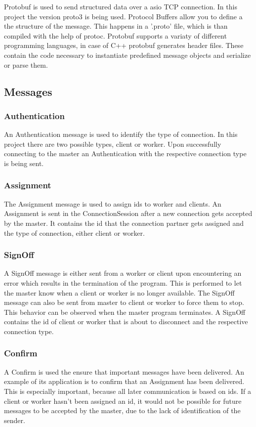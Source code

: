 \documentclass[12pt, letterpaper]{article}
\begin{document}
Protobuf is used to send structured data over a asio TCP connection. In this project the version proto3 is being used. Protocol Buffers allow you to define a the structure of the message. This happens in a '.proto' file, which is than compiled with the help of protoc. Protobuf supports a variaty of different programming languages, in case of C++ protobuf generates header files. These contain the code necessary to instantiate predefined message objects and serialize or parse them.  

\subsection{Messages}

\subsubsection{Authentication}
An Authentication message is used to identify the type of connection. In this project there are two possible types, client or worker. Upon successfully connecting to the master an Authentication with the respective connection type is being sent. 

\subsubsection{Assignment}
The Assignment message is used to assign ids to worker and clients. An Assignment is sent in the ConnectionSession after a new connection gets accepted by the master. It contains the id that the connection partner gets assigned and the type of connection, either client or worker.

\subsubsection{SignOff}
A SignOff message is either sent from a worker or client upon encountering an error which results in the termination of the program. This is performed to let the master know when a client or worker is no longer available. The SignOff message can also be sent from master to client or worker to force them to stop. This behavior can be observed when the master program terminates. A SignOff contains the id of client or worker that is about to disconnect and the respective connection type.

\subsubsection{Confirm}
A Confirm is used the ensure that important messages have been delivered. An example of its application is to confirm that an Assignment has been delivered. This is especially important, because all later communication is based on ids. If a client or worker hasn't been assigned an id, it would not be possible for future messages to be accepted by the master, due to the lack of identification of the sender. 
\end{document}
